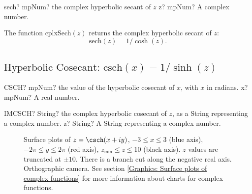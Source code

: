 \begin{mpFunctionsExtract}
	\mpFunctionOne
	{sech? mpNum? the complex hyperbolic secant of $z$}
	{z? mpNum? A complex number.}
\end{mpFunctionsExtract}


\vspace{0.3cm}
The function \textsf{cplxSech$(z)$} returns the complex hyperbolic secant of $z$: 
\begin{equation}
	\text{sech}(z) = 1/\cosh(z).
\end{equation}



\newpage
\subsection{\texorpdfstring{$\text{Hyperbolic Cosecant: csch}(x) = 1/\sinh(z)$}{csch}}

\begin{mpFunctionsExtract}
	\mpWorksheetFunctionOneNotImplemented
	{CSCH? mpNum? the value of the hyperbolic cosecant of $x$, with $x$ in radians.}
	{x? mpNum? A real number.}
\end{mpFunctionsExtract}

\vspace{0.6cm}
\begin{mpFunctionsExtract}
	\mpWorksheetFunctionOneNotImplemented
	{IMCSCH? String? the complex hyperbolic cosecant of $z$, as a String representing a complex number.}
	{z? String? A String representing a complex number.}
\end{mpFunctionsExtract}



\begin{figure}[ht]%
	\centering
	\qquad
	\caption[Complex Hyperbolic Cosecant]{Surface plots of $z = \csch(x + iy)$, $-3 \leq x \leq 3$ (blue axis), $-2 \pi \leq y \leq 2\pi$ (red axis), $z_{\text{min}} \leq z \leq 10$ (black axis). $z$ values are truncated at $\pm 10$. There is a branch cut along the negative real axis. Orthographic camera. See section \ref{Graphics: Surface plots of complex functions} for more information about charts for complex functions.} 
	\label{fig:Complex Hyperbolic Cosecant}%
\end{figure}



